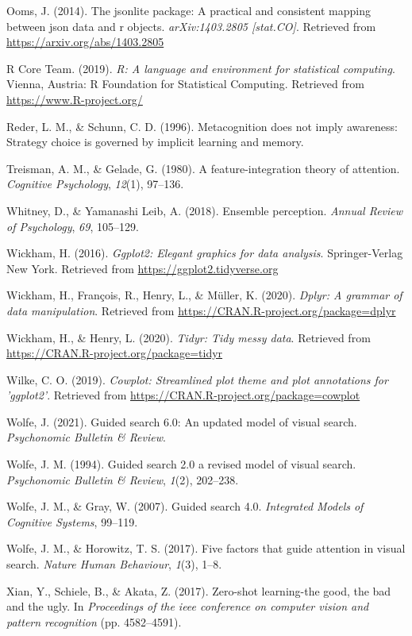 \documentclass[
  english,
  man]{apa6}
\begin{document}
\leavevmode\hypertarget{ref-R-jsonlite}{}%
Ooms, J. (2014). The jsonlite package: A practical and consistent mapping between json data and r objects. \emph{arXiv:1403.2805 {[}stat.CO{]}}. Retrieved from \url{https://arxiv.org/abs/1403.2805}

\leavevmode\hypertarget{ref-R-base}{}%
R Core Team. (2019). \emph{R: A language and environment for statistical computing}. Vienna, Austria: R Foundation for Statistical Computing. Retrieved from \url{https://www.R-project.org/}

\leavevmode\hypertarget{ref-reder1996metacognition}{}%
Reder, L. M., \& Schunn, C. D. (1996). Metacognition does not imply awareness: Strategy choice is governed by implicit learning and memory.

\leavevmode\hypertarget{ref-treisman1980feature}{}%
Treisman, A. M., \& Gelade, G. (1980). A feature-integration theory of attention. \emph{Cognitive Psychology}, \emph{12}(1), 97--136.

\leavevmode\hypertarget{ref-whitney2018ensemble}{}%
Whitney, D., \& Yamanashi Leib, A. (2018). Ensemble perception. \emph{Annual Review of Psychology}, \emph{69}, 105--129.

\leavevmode\hypertarget{ref-R-ggplot2}{}%
Wickham, H. (2016). \emph{Ggplot2: Elegant graphics for data analysis}. Springer-Verlag New York. Retrieved from \url{https://ggplot2.tidyverse.org}

\leavevmode\hypertarget{ref-R-dplyr}{}%
Wickham, H., François, R., Henry, L., \& Müller, K. (2020). \emph{Dplyr: A grammar of data manipulation}. Retrieved from \url{https://CRAN.R-project.org/package=dplyr}

\leavevmode\hypertarget{ref-R-tidyr}{}%
Wickham, H., \& Henry, L. (2020). \emph{Tidyr: Tidy messy data}. Retrieved from \url{https://CRAN.R-project.org/package=tidyr}

\leavevmode\hypertarget{ref-R-cowplot}{}%
Wilke, C. O. (2019). \emph{Cowplot: Streamlined plot theme and plot annotations for 'ggplot2'}. Retrieved from \url{https://CRAN.R-project.org/package=cowplot}

\leavevmode\hypertarget{ref-wolfe2021guided}{}%
Wolfe, J. (2021). Guided search 6.0: An updated model of visual search. \emph{Psychonomic Bulletin \& Review}.

\leavevmode\hypertarget{ref-wolfe1994guided}{}%
Wolfe, J. M. (1994). Guided search 2.0 a revised model of visual search. \emph{Psychonomic Bulletin \& Review}, \emph{1}(2), 202--238.

\leavevmode\hypertarget{ref-wolfe2007guided}{}%
Wolfe, J. M., \& Gray, W. (2007). Guided search 4.0. \emph{Integrated Models of Cognitive Systems}, 99--119.

\leavevmode\hypertarget{ref-wolfe2017five}{}%
Wolfe, J. M., \& Horowitz, T. S. (2017). Five factors that guide attention in visual search. \emph{Nature Human Behaviour}, \emph{1}(3), 1--8.

\leavevmode\hypertarget{ref-xian2017zero}{}%
Xian, Y., Schiele, B., \& Akata, Z. (2017). Zero-shot learning-the good, the bad and the ugly. In \emph{Proceedings of the ieee conference on computer vision and pattern recognition} (pp. 4582--4591).

\endgroup
\end{document}
